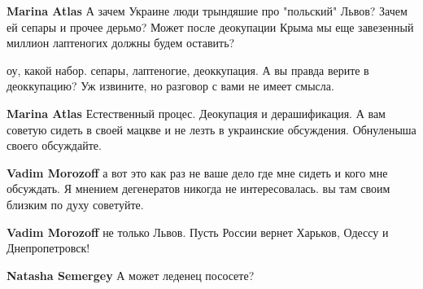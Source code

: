\begin{itemize}
\begin{itemize}
\textbf{Marina Atlas} А зачем Украине люди трындяшие про "польский" Львов? Зачем ей сепары и прочее дерьмо? Может после деокупации Крыма мы еще завезенный миллион лаптеногих должны будем оставить?

 
оу, какой набор. сепары, лаптеногие, деоккупация. А вы правда верите в деоккупацию? Уж извините, но разговор с вами не имеет смысла.

 
\textbf{Marina Atlas} Естественный процес. Деокупация и дерашификация. А вам советую сидеть в своей мацкве и не лезть в украинские обсуждения. Обнуленыша своего обсуждайте.

 
\textbf{Vadim Morozoff} а вот это как раз не ваше дело где мне сидеть и кого мне обсуждать. Я мнением дегенератов никогда не интересовалась. вы там своим близким по духу советуйте.

 
\textbf{Vadim Morozoff} не только Львов. Пусть России вернет Харьков, Одессу и Днепропетровск!

 
\textbf{Natasha Semergey} А может леденец пососете?

 

\end{itemize}
\end{itemize}
